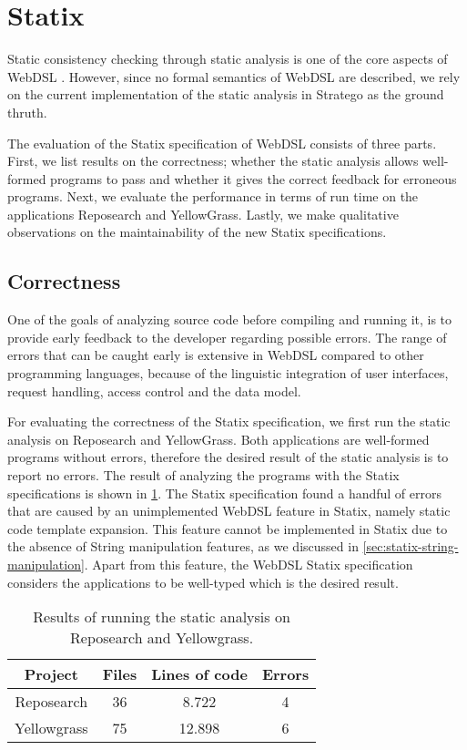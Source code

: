 \section{\label{sec:eval-statix}Statix}

  Static consistency checking through static analysis is one of the core aspects of WebDSL \autocite{Hemel2011}. However, since no formal semantics of WebDSL are described, we rely on the current implementation of the static analysis in Stratego as the ground thruth.
  
  The evaluation of the Statix specification of WebDSL consists of three parts. First, we list results on the correctness; whether the static analysis allows well-formed programs to pass and whether it gives the correct feedback for erroneous programs. Next, we evaluate the performance in terms of run time on the applications Reposearch and YellowGrass. Lastly, we make qualitative observations on the maintainability of the new Statix specifications.

  \subsection{Correctness}

    One of the goals of analyzing source code before compiling and running it, is to provide early feedback to the developer regarding possible errors. The range of errors that can be caught early is extensive in WebDSL compared to other programming languages, because of the linguistic integration of user interfaces, request handling, access control and the data model.

    For evaluating the correctness of the Statix specification, we first run the static analysis on Reposearch and YellowGrass. Both applications are well-formed programs without errors, therefore the desired result of the static analysis is to report no errors. The result of analyzing the programs with the Statix specifications is shown in \cref{tbl:statix-reposearch-yellowgrass-results}. The Statix specification found a handful of errors that are caused by an unimplemented WebDSL feature in Statix, namely static code template expansion. This feature cannot be implemented in Statix due to the absence of String manipulation features, as we discussed in \cref{sec:statix-string-manipulation}. Apart from this feature, the WebDSL Statix specification considers the applications to be well-typed which is the desired result.

    \begin{table}[h]
      \centering
      \begin{tabular}{ | c || c | c | c | }
        \hline
        Project & Files & Lines of code & Errors \\
        \hline
        Reposearch & 36 & 8.722 & 4 \\
        \hline
        Yellowgrass & 75 & 12.898 & 6 \\
        \hline
      \end{tabular}
      \caption{\label{tbl:statix-reposearch-yellowgrass-results}Results of running the static analysis on Reposearch and Yellowgrass.}
    \end{table}

